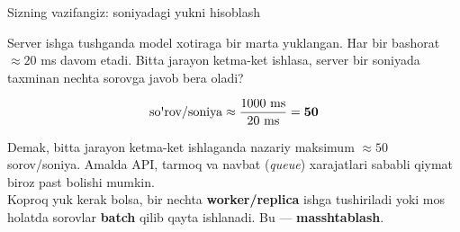 \documentclass[aspectratio=169,11pt]{beamer}
\newcommand{\uzq}{\textquotesingle{}}   %
\begin{document}
\begin{frame}{Sizning vazifangiz: soniyadagi yukni hisoblash}
  \small

  \begin{tcolorbox}[warnbox,title=Savol,top=2pt,bottom=2pt]
    Server ishga tushganda model xotiraga bir marta yuklangan.
    Har bir bashorat $\approx 20$ ms davom etadi.
    Bitta jarayon ketma-ket ishlasa, server bir soniyada taxminan
    nechta so\uzq{}rovga javob bera oladi?
  \end{tcolorbox}

  \pause

  \vspace{3pt}

  \begin{tcolorbox}[okbox,title=Javob,top=2pt,bottom=2pt]
    \[
      \text{so\uzq{}rov/soniya}
      \approx
      \frac{1000\ \text{ms}}{20\ \text{ms}}
      =
      \mathbf{50}
    \]

    \footnotesize
    Demak, bitta jarayon ketma-ket ishlaganda nazariy maksimum
    $\approx 50$ so\uzq{}rov/soniya. Amalda API, tarmoq va navbat
    (\textit{queue}) xarajatlari sababli qiymat biroz past bo\uzq{}lishi mumkin.\\[3pt]

    Ko\uzq{}proq yuk kerak bo\uzq{}lsa, bir nechta \textbf{worker/replica}
    ishga tushiriladi yoki mos holatda so\uzq{}rovlar \textbf{batch}
    qilib qayta ishlanadi. Bu --- \textbf{masshtablash}.
  \end{tcolorbox}
\end{frame}
\end{document}
